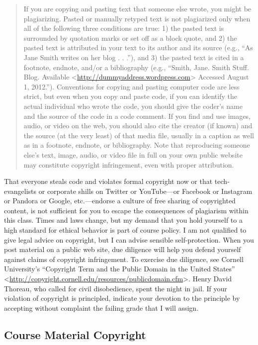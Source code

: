 \documentclass[]{article}
\begin{document}
\begin{quote}
If you are copying and pasting text that someone else wrote, you might
be plagiarizing. Pasted or manually retyped text is not plagiarized only
when all of the following three conditions are true: 1) the pasted text
is surrounded by quotation marks or set off as a block quote, and 2) the
pasted text is attributed in your text to its author and its source
(e.g., ``As Jane Smith writes on her blog . . .''), and 3) the pasted
text is cited in a footnote, endnote, and/or a bibliography (e.g.,
``Smith, Jane. Smith Stuff. Blog. Available
\textless{}\url{http://dummyaddress.wordpress.com}\textgreater{}
Accessed August 1, 2012.''). Conventions for copying and pasting
computer code are less strict, but even when you copy and paste code, if
you can identify the actual individual who wrote the code, you should
give the coder's name and the source of the code in a code comment. If
you find and use images, audio, or video on the web, you should also
cite the creator (if known) and the source (at the very least) of that
media file, usually in a caption as well as in a footnote, endnote, or
bibliography. Note that reproducing someone else's text, image, audio,
or video file in full on your own public website may constitute
copyright infringement, even with proper attribution.
\end{quote}

That everyone steals code and violates formal copyright now or that
tech-evangelists or corporate shills on Twitter or YouTube---or Facebook
or Instagram or Pandora or Google, etc.---endorse a culture of free
sharing of copyrighted content, is not sufficient for you to escape the
consequences of plagiarism within this class. Times and laws change, but
my demand that you hold yourself to a high standard for ethical behavior
is part of course policy. I am not qualified to give legal advice on
copyright, but I can advise sensible self-protection. When you post
material on a public web site, due diligence will help you defend
yourself against claims of copyright infringement. To exercise due
diligence, see Cornell University's ``Copyright Term and the Public
Domain in the United States''
\textless{}\url{http://copyright.cornell.edu/resources/publicdomain.cfm}\textgreater{}.
Henry David Thoreau, who called for civil disobedience, spent the night
in jail. If your violation of copyright is principled, indicate your
devotion to the principle by accepting without complaint the failing
grade that I will assign.

\subsection{Course Material Copyright}\label{course-material-copyright}
\end{document}
